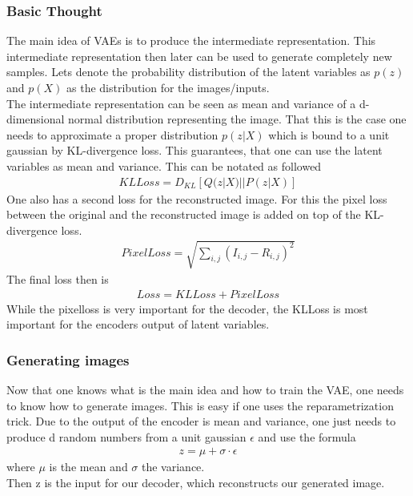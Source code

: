 \documentclass[
     11pt,         %
     a4paper,      %
     oneside,
     ]{article}
\begin{document}
\subsubsection{Basic Thought}
The main idea of VAEs is to produce the intermediate representation. This intermediate representation then later can be used to generate completely new samples. Lets denote the probability distribution of the latent variables as $p(z)$ and $p(X)$ as the distribution for the images/inputs. \\
The intermediate representation can be seen as mean and variance of a d-dimensional normal distribution representing the image.
That this is the case one needs to approximate a proper distribution $p(z|X)$ which is bound to a unit gaussian by KL-divergence loss. This guarantees, that one can use the latent variables as mean and variance. This can be notated as followed
\begin{align*}
  KLLoss = D_{KL}[Q(z|X)||P(z|X)]
\end{align*}
One also has a second loss for the reconstructed image. For this the pixel loss between the original and the reconstructed image is added on top of the KL-divergence loss.
\begin{align*}
  PixelLoss = \sqrt{\sum_{i,j} (I_{i,j} - R_{i,j})^2}
\end{align*}
The final loss then is
\begin{align*}
  Loss = KLLoss + PixelLoss
\end{align*}
While the pixelloss is very important for the decoder, the KLLoss is most important for the encoders output of latent variables.
\subsubsection{Generating images}
Now that one knows what is the main idea and how to train the VAE, one needs to know how to generate images. This is easy if one uses the reparametrization trick. Due to the output of the encoder is mean and variance, one just needs to produce d random numbers from a unit gaussian $\epsilon$ and use the formula
\begin{align*}
  z = \mu + \sigma \cdot \epsilon
\end{align*}
where $\mu$ is the mean and $\sigma$ the variance.\\
Then z is the input for our decoder, which reconstructs our generated image.
\end{document}
